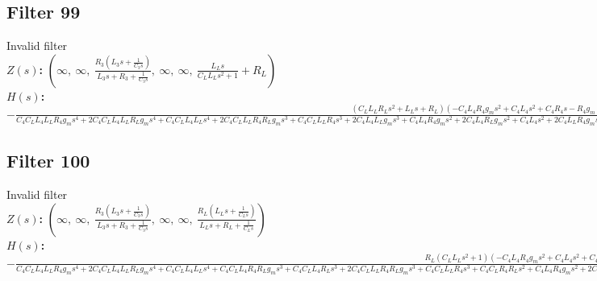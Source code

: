 \documentclass{article}
\begin{document}
\subsection*{Filter 99}
Invalid filter \\ 
\textbf{$Z(s)$:} $\left( \infty, \  \infty, \  \frac{R_{3} \left(L_{3} s + \frac{1}{C_{3} s}\right)}{L_{3} s + R_{3} + \frac{1}{C_{3} s}}, \  \infty, \  \infty, \  \frac{L_{L} s}{C_{L} L_{L} s^{2} + 1} + R_{L}\right)$ \\ 
\textbf{$H(s)$:} $- \frac{\left(C_{L} L_{L} R_{L} s^{2} + L_{L} s + R_{L}\right) \left(- C_{4} L_{4} R_{4} g_{m} s^{2} + C_{4} L_{4} s^{2} + C_{4} R_{4} s - R_{4} g_{m} + 1\right)}{C_{4} C_{L} L_{4} L_{L} R_{4} g_{m} s^{4} + 2 C_{4} C_{L} L_{4} L_{L} R_{L} g_{m} s^{4} + C_{4} C_{L} L_{4} L_{L} s^{4} + 2 C_{4} C_{L} L_{L} R_{4} R_{L} g_{m} s^{3} + C_{4} C_{L} L_{L} R_{4} s^{3} + 2 C_{4} L_{4} L_{L} g_{m} s^{3} + C_{4} L_{4} R_{4} g_{m} s^{2} + 2 C_{4} L_{4} R_{L} g_{m} s^{2} + C_{4} L_{4} s^{2} + 2 C_{4} L_{L} R_{4} g_{m} s^{2} + 2 C_{4} R_{4} R_{L} g_{m} s + C_{4} R_{4} s + C_{L} L_{L} R_{4} g_{m} s^{2} + 2 C_{L} L_{L} R_{L} g_{m} s^{2} + C_{L} L_{L} s^{2} + 2 L_{L} g_{m} s + R_{4} g_{m} + 2 R_{L} g_{m} + 1}$ \\ 
\subsection*{Filter 100}
Invalid filter \\ 
\textbf{$Z(s)$:} $\left( \infty, \  \infty, \  \frac{R_{3} \left(L_{3} s + \frac{1}{C_{3} s}\right)}{L_{3} s + R_{3} + \frac{1}{C_{3} s}}, \  \infty, \  \infty, \  \frac{R_{L} \left(L_{L} s + \frac{1}{C_{L} s}\right)}{L_{L} s + R_{L} + \frac{1}{C_{L} s}}\right)$ \\ 
\textbf{$H(s)$:} $- \frac{R_{L} \left(C_{L} L_{L} s^{2} + 1\right) \left(- C_{4} L_{4} R_{4} g_{m} s^{2} + C_{4} L_{4} s^{2} + C_{4} R_{4} s - R_{4} g_{m} + 1\right)}{C_{4} C_{L} L_{4} L_{L} R_{4} g_{m} s^{4} + 2 C_{4} C_{L} L_{4} L_{L} R_{L} g_{m} s^{4} + C_{4} C_{L} L_{4} L_{L} s^{4} + C_{4} C_{L} L_{4} R_{4} R_{L} g_{m} s^{3} + C_{4} C_{L} L_{4} R_{L} s^{3} + 2 C_{4} C_{L} L_{L} R_{4} R_{L} g_{m} s^{3} + C_{4} C_{L} L_{L} R_{4} s^{3} + C_{4} C_{L} R_{4} R_{L} s^{2} + C_{4} L_{4} R_{4} g_{m} s^{2} + 2 C_{4} L_{4} R_{L} g_{m} s^{2} + C_{4} L_{4} s^{2} + 2 C_{4} R_{4} R_{L} g_{m} s + C_{4} R_{4} s + C_{L} L_{L} R_{4} g_{m} s^{2} + 2 C_{L} L_{L} R_{L} g_{m} s^{2} + C_{L} L_{L} s^{2} + C_{L} R_{4} R_{L} g_{m} s + C_{L} R_{L} s + R_{4} g_{m} + 2 R_{L} g_{m} + 1}$ \\ 
\end{document}

